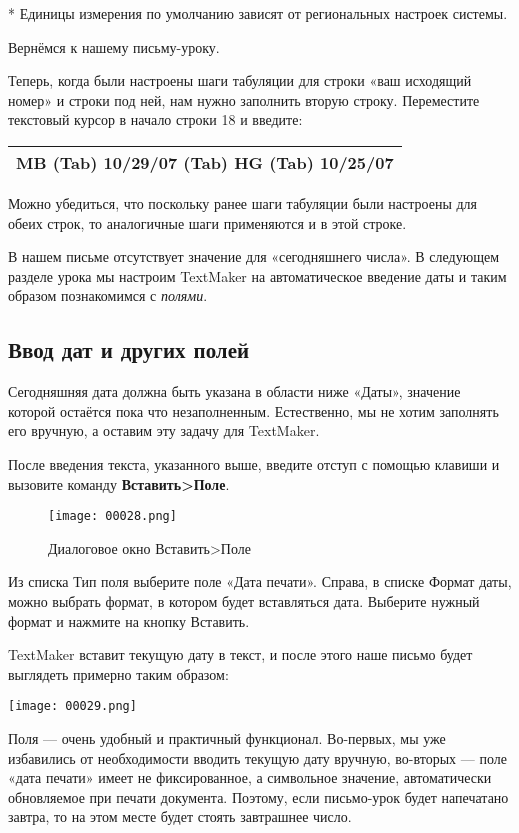 \documentclass[a4paper,10pt]{article}
\begin{document}
* Единицы измерения по умолчанию зависят от региональных настроек системы.

Вернёмся к нашему письму-уроку.

Теперь, когда были настроены шаги табуляции для строки «ваш исходящий номер» и строки под ней, нам нужно заполнить вторую строку.
Переместите текстовый курсор в начало строки 18 и введите:

\begin{center}
\begin{tabular}{ | m{15cm} | }
\hline
MB (Tab) 10/29/07 (Tab) HG (Tab) 10/25/07\\
\hline
\end{tabular}
\end{center}

Можно убедиться, что поскольку ранее шаги табуляции были настроены для обеих строк, то аналогичные шаги применяются и в этой строке.

В нашем письме отсутствует значение для «сегодняшнего числа». В следующем разделе урока мы настроим TextMaker на автоматическое введение даты и таким образом познакомимся с \textit{полями}.

\subsection{Ввод дат и других полей}
Сегодняшняя дата должна быть указана в области ниже «Даты», значение которой остаётся пока что незаполненным. Естественно, мы не хотим заполнять его вручную, а оставим эту задачу для TextMaker.

После введения текста, указанного выше, введите отступ с помощью клавиши  и вызовите команду \textbf{Вставить>Поле}.

\begin{figure}[ht]
\texttt{[image: 00028.png]}
\centering
\caption{Диалоговое окно  Вставить>Поле}
\end{figure}

Из списка Тип поля выберите поле «Дата печати». Справа, в списке Формат даты, можно выбрать формат, в котором будет вставляться дата. Выберите нужный формат и нажмите на кнопку Вставить.

TextMaker вставит текущую дату в текст, и после этого наше письмо будет выглядеть примерно таким образом:

\texttt{[image: 00029.png]}

Поля — очень удобный и практичный функционал. Во-первых, мы уже избавились от необходимости вводить текущую дату вручную, во-вторых — поле «дата печати» имеет не фиксированное, а символьное значение, автоматически обновляемое при печати документа. Поэтому, если письмо-урок будет напечатано завтра, то на этом месте будет стоять завтрашнее число.
\end{document}

